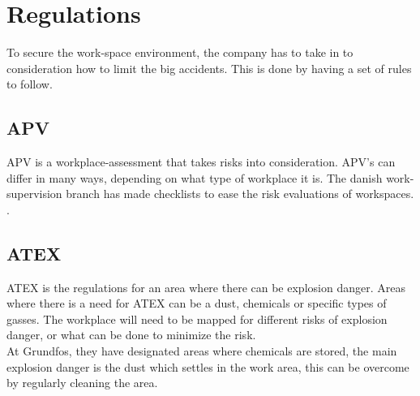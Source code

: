 \section{Regulations}\label{ch:regulation}
To secure the work-space environment, the company has to take in to consideration how to limit the big accidents. This is done by having a set of rules to follow.\\

\subsection{APV}
APV is a workplace-assessment that takes risks into consideration. APV's can differ in many ways, depending on what type of workplace it is. The danish work-supervision branch has made checklists to ease the risk evaluations of workspaces. \cite{Apv}\cite{Risikovurdering}.\\


\subsection{ATEX}
ATEX is the regulations for an area where there can be explosion danger. Areas where there is a need for ATEX can be a dust, chemicals or specific types of gasses. The workplace will need to be mapped for different risks of explosion danger, or what can be done to minimize the risk.\\
At Grundfos, they have designated areas where chemicals are stored, the main explosion danger is the dust which settles in the work area, this can be overcome by regularly cleaning the area\cite{ATEX}.  

